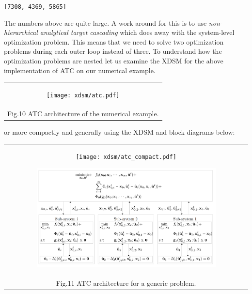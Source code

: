 \documentclass[11pt]{article}
\makeatletter
\newcommand{\boxspacing}{\kern\kvtcb@left@rule\kern\kvtcb@boxsep}
\newcommand{\prompt}[4]{
        {\ttfamily\llap{{\color{#2}[#3]:\hspace{3pt}#4}}\vspace{-\baselineskip}}
    }
\makeatother
\begin{document}
            \begin{tcolorbox}[breakable, size=fbox, boxrule=.5pt, pad at break*=1mm, opacityfill=0]
\prompt{Out}{outcolor}{12}{\boxspacing}
\begin{Verbatim}[commandchars=\\\{\}]
[7308, 4369, 5865]
\end{Verbatim}
\end{tcolorbox}
        
    The numbers above are quite large. A work around for this is to use
\emph{non-hierarchical analytical target cascading} which does away with
the system-level optimization problem. This means that we need to solve
two optimization problems during each outer loop instead of three. To
understand how the optimization problems are nested let us examine the
XDSM for the above implementation of ATC on our numerical example.

\begin{longtable}[]{@{}c@{}}
\toprule
\endhead
\begin{minipage}[t]{0.97\columnwidth}\centering
    \begin{figure}
        \centering
        \texttt{[image: xdsm/atc.pdf]}
    \end{figure}
\end{minipage}\tabularnewline
Fig.10 ATC architecture of the numerical example.\tabularnewline
\bottomrule
\end{longtable}

or more compactly and generally using the XDSM and block diagrams below:

\begin{longtable}[]{@{}c@{}}
    \toprule
    \endhead
    \begin{minipage}[t]{0.97\columnwidth}\centering
        \begin{figure}
            \centering
            \texttt{[image: xdsm/atc\_compact.pdf]}
        \end{figure}
        \begin{figure}
            \centering
            \includegraphics[width=0.9\textwidth]{images/ATC_diagram.png}
        \end{figure}
    \end{minipage}\tabularnewline
    Fig.11 ATC architecture for a generic problem.\tabularnewline
    \bottomrule
\end{longtable}


    
    
    
\end{document}
